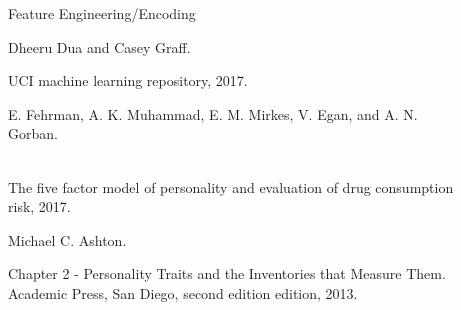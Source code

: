 \documentclass[6pt, final, xcolor=table]{beamer}
\newlength{\sepwidth}
\newlength{\colwidth}
\newcommand{\separatorcolumn}{\begin{column}{\sepwidth}\end{column}}
\begin{document}
\begin{frame}[t]
\begin{columns}[t]
\begin{column}{\colwidth}
\begin{block}{Feature Engineering/Encoding}
\begin{description}
    \small{\item [{[1]}] Dheeru Dua and Casey Graff.} \footnotesize{UCI machine learning repository, 2017.} 
    \small{\item [{[2]}] E. Fehrman, A. K. Muhammad, E. M. Mirkes, V. Egan, and A. N. Gorban.} \\
    \footnotesize{The five factor model of personality and evaluation of drug consumption risk, 2017.}
    \small{\item [{[3]}] Michael C. Ashton.} \footnotesize{Chapter 2 - Personality Traits and the Inventories that Measure Them. \\
    Academic Press, San Diego, second edition edition, 2013.}
    
\end{description}




  \end{block}







\end{column}

\separatorcolumn

\begin{column}{\colwidth}


\end{column}
\end{columns}
\end{frame}
\end{document}
